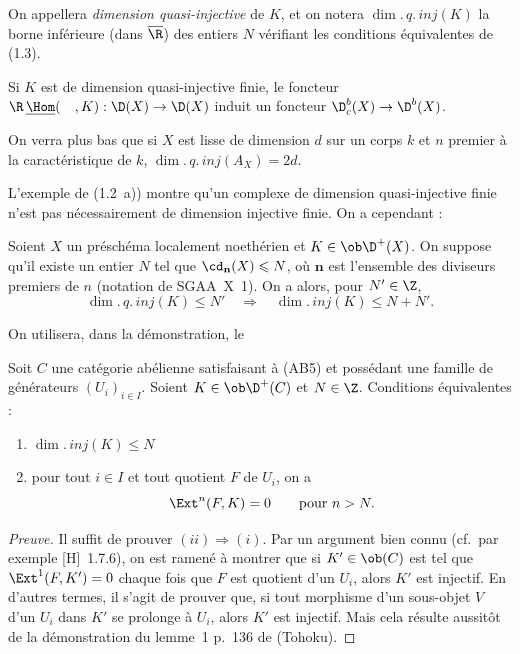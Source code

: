 \begin{definition}
On appellera \emph{dimension quasi-injective} de $K$, et on notera $\dim.\,q.\,inj(K)$ la borne inférieure (dans $\overline{\R}$) des entiers $N$ vérifiant les conditions équivalentes de (1.3).
\end{definition}

Si $K$ est de dimension quasi-injective finie, le foncteur $\R\,\underline{\Hom}(\quad,K) : \D(X) \to \D(X)$ induit un foncteur $\D_c^{b}(X) \to \D^{b}(X)$.

On verra plus bas que si $X$ est lisse de dimension $d$ sur un corps $k$ et $n$ premier à la caractéristique de $k$, $\dim.\,q.\,inj(A_X) = 2d$.

L'exemple de (1.2~a)) montre qu'un complexe de dimension quasi-injective finie n'est pas nécessairement de dimension injective finie. On a cependant :

\begin{proposition}
Soient $X$ un préschéma localement noethérien et $K \in \ob \D^{+}(X)$. On suppose qu'il existe un entier $N$ tel que $\cd_{\mathbf{n}}(X) \leqslant N$, où $\mathbf{n}$ est l'ensemble des diviseurs premiers de $n$ (notation de SGAA~X~1). On a alors, pour $N' \in \Z$,
\[
\dim.\,q.\,inj(K) \leqslant N' \quad \Longrightarrow \quad \dim.\,inj(K) \leqslant N + N'.
\]
\end{proposition}

On utilisera, dans la démonstration, le

\begin{lemma}
Soit $C$ une catégorie abélienne satisfaisant à (AB5) et possédant une famille de générateurs $(U_i)_{i \in I}$. Soient $K \in \ob \D^{+}(C)$ et $N \in \Z$. Conditions équivalentes :
\begin{enumerate}
\item[(i)] $\dim.\,inj(K) \leqslant N$
\item[(ii)] pour tout $i \in I$ et tout quotient $F$ de $U_i$, on a
\[
\Ext^n(F,K) = 0 \qquad \text{pour } n > N.
\]
\end{enumerate}
\end{lemma}

\begin{proof}[Preuve]
Il suffit de prouver $(ii) \Rightarrow (i)$. Par un argument bien connu (cf.\ par exemple [H]~1.7.6), on est ramené à montrer que si $K' \in \ob(C)$ est tel que $\Ext^1(F,K') = 0$ chaque fois que $F$ est quotient d'un $U_i$, alors $K'$ est injectif. En d'autres termes, il s'agit de prouver que, si tout morphisme d'un sous-objet $V$ d'un $U_i$ dans $K'$ se prolonge à $U_i$, alors $K'$ est injectif. Mais cela résulte aussitôt de la démonstration du lemme~1 p.~136 de (Tohoku).
\end{proof}

